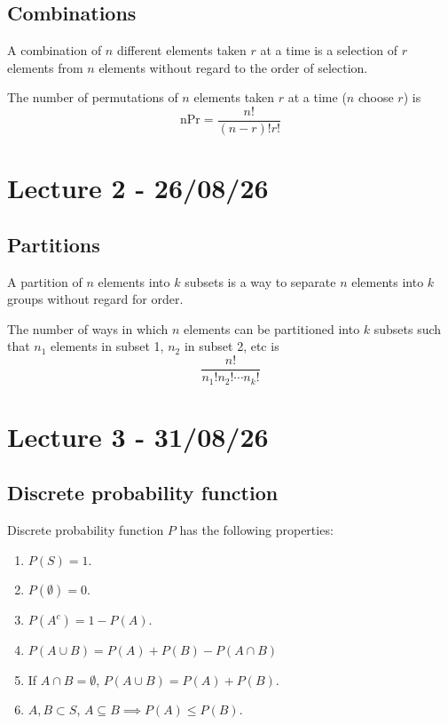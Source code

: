 \documentclass[11pt]{article}
\begin{document}
\subsection{Combinations}
\begin{definition}
    A combination of $n$ different elements taken $r$ at a time is a selection of $r$ elements from $n$ elements without regard to the order of selection.
\end{definition}
\begin{theorem}
    The number of permutations of $n$ elements taken $r$ at a time ($n$ choose $r$) is 
    \[
        \text{nPr} = \frac{n!}{(n-r)!r!}
    \]
    
\end{theorem}

\section{Lecture 2 - 26/08/26}
\subsection{Partitions}
\begin{definition}
    A partition of $n$ elements into $k$ subsets is a way to separate $n$ elements into $k$ groups without regard for order.
\end{definition}

\begin{theorem}
    The number of ways in which $n$ elements can be partitioned into $k$ subsets such that $n_1$ elements in subset 1, 
    $n_2$ in subset 2, etc is 
    \[
        \frac{n!}{n_1!n_2! \cdots n_k!}
    \]
\end{theorem}

\section{Lecture 3 - 31/08/26}
\subsection{Discrete probability function}
Discrete probability function $P$ has the following properties:
\begin{enumerate}
    \item $P(S) = 1$.
    \item $P(\emptyset) = 0$.
    \item $P(A^c) = 1 - P(A)$.
    \item $P(A \cup B) = P(A) + P(B) - P(A \cap B)$
    \item If $A \cap B = \emptyset$, $P(A \cup B) = P(A) + P(B)$.
    \item $A, B \subset S$, $A \subseteq B \implies P(A) \le P(B)$.
\end{enumerate}
\end{document}
